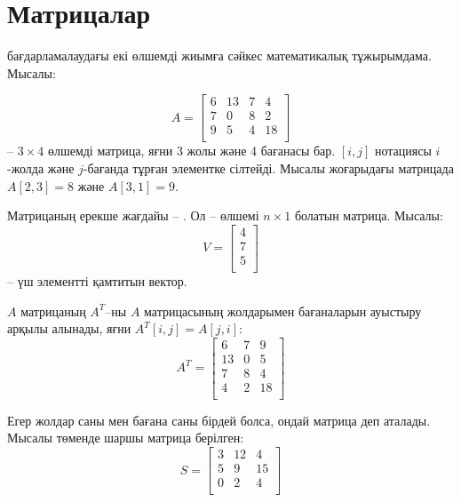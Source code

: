 \chapter{Матрицалар}


 бағдарламалаудағы екі өлшемді жиымға сәйкес
математикалық тұжырымдама. Мысалы:

\[
A = 
 \begin{bmatrix}
  6 & 13 & 7 & 4 \\
  7 & 0 & 8 & 2 \\
  9 & 5 & 4 & 18 \\
 \end{bmatrix}
\]
-- $3 \times 4$ өлшемді матрица, яғни 
3 жолы және 4 бағанасы бар.
$[i,j]$ нотациясы $i$-жолда және
$j$-бағанда тұрған элементке сілтейді.
Мысалы жоғарыдағы матрицада $A[2,3]=8$
және $A[3,1]=9$.


Матрицаның ерекше жағдайы -- . Ол --
өлшемі $n \times 1$ болатын матрица. 
Мысалы: 
\[
V =
\begin{bmatrix}
4 \\
7 \\
5 \\
\end{bmatrix}
\]
-- үш элементті қамтитын вектор. 


$A$ матрицаның  $A^T$–ны
$A$ матрицасының 
жолдарымен бағаналарын ауыстыру арқылы алынады,
яғни $A^T[i,j]=A[j,i]$:
\[
A^T = 
 \begin{bmatrix}
  6 & 7 & 9 \\
  13 & 0 & 5 \\
  7 & 8 & 4 \\
  4 & 2 & 18 \\
 \end{bmatrix}
\]


Егер
жолдар саны мен бағана саны бірдей болса, ондай матрица  деп аталады. 
Мысалы төменде шаршы матрица берілген:
\[
S = 
 \begin{bmatrix}
  3 & 12 & 4  \\
  5 & 9 & 15  \\
  0 & 2 & 4 \\
 \end{bmatrix}
\]

